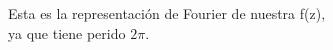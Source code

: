 \documentclass[preview]{standalone}
\begin{document}
\begin{center}
Esta es la representación de Fourier de nuestra f(z),\\ ya que tiene perido $2\pi$.
\end{center}
\end{document}

